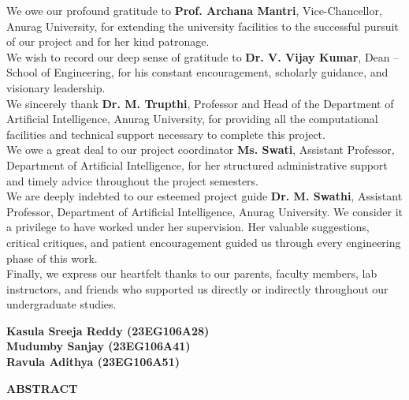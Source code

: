 \documentclass[12pt,a4paper]{report}
\begin{document}
\noindent We owe our profound gratitude to \textbf{Prof. Archana Mantri}, Vice-Chancellor, Anurag University, for extending the university facilities to the successful pursuit of our project and for her kind patronage.\\[0.15in]

\noindent We wish to record our deep sense of gratitude to \textbf{Dr. V. Vijay Kumar}, Dean -- School of Engineering, for his constant encouragement, scholarly guidance, and visionary leadership.\\[0.15in]

\noindent We sincerely thank \textbf{Dr. M. Trupthi}, Professor and Head of the Department of Artificial Intelligence, Anurag University, for providing all the computational facilities and technical support necessary to complete this project.\\[0.15in]

\noindent We owe a great deal to our project coordinator \textbf{Ms. Swati}, Assistant Professor, Department of Artificial Intelligence, for her structured administrative support and timely advice throughout the project semesters.\\[0.15in]

\noindent We are deeply indebted to our esteemed project guide \textbf{Dr. M. Swathi}, Assistant Professor, Department of Artificial Intelligence, Anurag University. We consider it a privilege to have worked under her supervision. Her valuable suggestions, critical critiques, and patient encouragement guided us through every engineering phase of this work.\\[0.15in]

\noindent Finally, we express our heartfelt thanks to our parents, faculty members, lab instructors, and friends who supported us directly or indirectly throughout our undergraduate studies.

\vspace{0.4in}
\begin{flushright}
    \textbf{Kasula Sreeja Reddy (23EG106A28)}\\
    \textbf{Mudumby Sanjay (23EG106A41)}\\
    \textbf{Ravula Adithya (23EG106A51)}
\end{flushright}

\newpage
{}
\setcounter{page}{1}
\begin{center}
    {\bfseries\Large ABSTRACT}
\end{center}
\vspace{0.2in}
\end{document}
